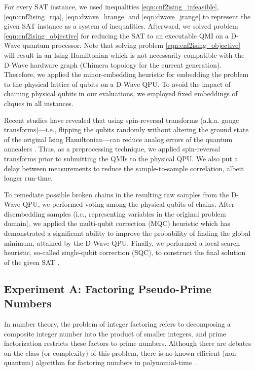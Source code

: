 \documentclass[fleqn,10pt]{wlscirep}
\begin{document}
For every SAT instance, we used inequalities \eqref{eqn:cnf2ising_infeasible}, \eqref{eqn:cnf2ising_rqa}, \eqref{eqn:dwave_hrange} and \eqref{eqn:dwave_jrange} to represent the given SAT instance as a system of inequalities. Afterward, we solved problem \eqref{eqn:cnf2ising_objective} for reducing the SAT to an executable QMI on a D-Wave quantum processor. Note that solving problem \eqref{eqn:cnf2ising_objective} will result in an Ising Hamiltonian which is not necessarily compatible with the D-Wave hardware graph (Chimera topology for the current generation). Therefore, we applied the minor-embedding heuristic \cite{cai2014practical} for embedding the problem to the physical lattice of qubits on a D-Wave QPU. To avoid the impact of chaining physical qubits in our evaluations, we employed fixed embeddings of cliques in all instances. 

Recent studies have revealed that using spin-reversal transforms (a.k.a. gauge transforms)—i.e., flipping the qubits randomly without altering the ground state of the original Ising Hamiltonian—can reduce analog errors of the quantum annealers \cite{pelofske2019optimizing}. Thus, as a preprocessing technique, we applied spin-reversal transforms prior to submitting the QMIs to the physical QPU. We also put a delay between measurements to reduce the sample-to-sample correlation, albeit longer run-time. 

To remediate possible broken chains in the resulting raw samples from the D-Wave QPU, we performed voting among the physical qubits of chains. After disembedding samples (i.e., representing variables in the original problem domain), we applied the multi-qubit correction (MQC) heuristic \cite {dorband2018method} which has demonstrated a significant ability to improve the probability of finding the global minimum, attained by the D-Wave QPU. Finally, we performed a local search heuristic, so-called single-qubit correction (SQC), to construct the final solution of the given SAT \cite {dorband2018method}. 

\subsection*{Experiment A: Factoring Pseudo-Prime Numbers}
In number theory, the problem of integer factoring refers to decomposing a composite integer number into the product of smaller integers, and prime factorization restricts these factors to prime numbers. Although there are debates on the class (or complexity) of this problem, there is no known efficient (non-quantum) algorithm for factoring numbers in polynomial-time \cite{balasubramanian2018integer}.
\end{document}
